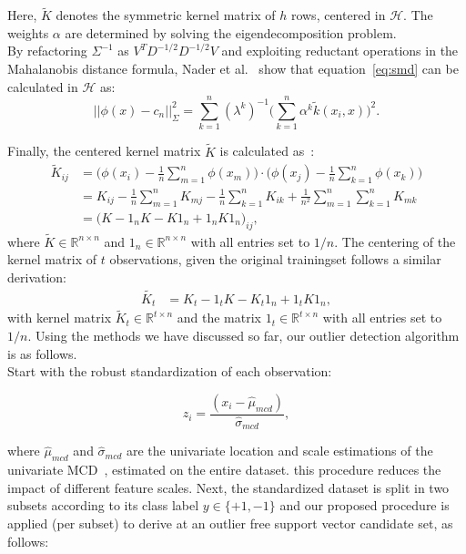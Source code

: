 \documentclass[preprint,12pt]{elsarticle}
\begin{document}
	Here, $\tilde{K}$ denotes the symmetric kernel matrix of $h$ rows, centered in $\mathcal{H}$. The weights $\alpha$ are determined by solving the eigendecomposition problem. \\
	By refactoring $\Sigma^{-1}$ as $V^T D^{-1/2} D^{-1/2} V$ and exploiting reductant operations in the Mahalanobis distance formula, Nader et al.~\cite{nader2014mahalanobis} show that equation~\eqref{eq:smd} can be calculated in $\mathcal{H}$ as:
	\begin{equation}
	\label{eq:Mahal}
	||\phi(x) - c_n||^2_{\Sigma} = \sum_{k=1}^{n} (\lambda^k)^{-1} \big( \sum_{k=1}^{n} \alpha^k \tilde{k}(x_i, x) \big)^2.
	\end{equation}	
		
Finally, the centered kernel matrix $\tilde{K}$ is calculated as~\cite{scholkopf1998nonlinear}:
	\begin{align}
	\label{eq:centerKh}
	\tilde{K}_{ij} &= \Big(\phi(x_i) - \frac{1}{n}\sum_{m=1}^n\phi(x_m)\Big) \cdot \Big(\phi(x_j) - \frac{1}{n}\sum_{k=1}^n\phi(x_k)\Big) \\
	&= K_{ij} - \frac{1}{n}\sum_{m=1}^n K_{mj} - \frac{1}{n}\sum_{k=1}^n K_{ik} + \frac{1}{n^2}\sum_{m=1}^n\sum_{k=1}^n K_{mk} \\
	&= \Big(K - 1_n K - K1_n + 1_n K1_n\Big)_{ij},
	\end{align}
	where $ \tilde{K} \in \mathbb{R}^{n \times n}$ and $1_n \in \mathbb{R}^{n\times n}$ with all entries set to $1/n$. 
	The centering of the kernel matrix of $t$ observations, given the original trainingset follows a similar derivation:
	\begin{align}
	\label{eq:centerKt}
	\tilde{K_t} &= K_t - 1_t K - K_t 1_n + 1_t K1_n,
	\end{align}
	with kernel matrix $ \tilde{K}_t \in \mathbb{R}^{t \times n}$ and the matrix $1_t \in \mathbb{R}^{t \times n}$ with all entries set to $1/n$. Using the methods we have discussed so far, our outlier detection algorithm is as follows. \\
	
	Start with the robust standardization of each observation: 
	
	\begin{equation}
		z_i = \frac{(x_i - \hat{\mu}_{mcd})}{\hat{\sigma}_{mcd}} ,
	\end{equation}
	
	where $\hat{\mu}_{mcd}$ and $\hat{\sigma}_{mcd}$ are the univariate location and scale estimations of the univariate MCD~\cite{rousseeuw1999fast}, estimated on the entire dataset. this procedure reduces the impact of different feature scales. Next, the standardized dataset is split in two subsets according to its class label $y \in \{+1, -1\}$ and our proposed  procedure is applied (per subset) to derive at an outlier free support vector candidate set, as follows:
	
\end{document}

